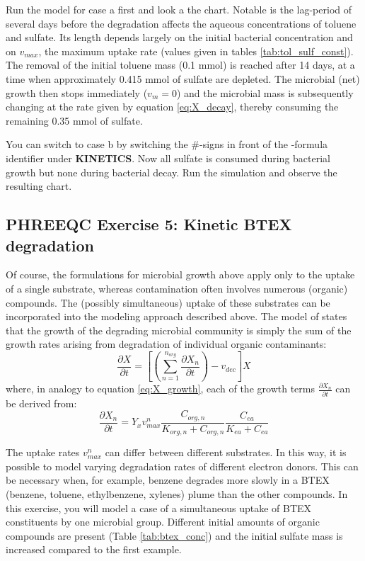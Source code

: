 Run the model for case a first and look a the chart. Notable is the lag-period of several days before the degradation affects the aqueous concentrations of toluene and sulfate. Its length depends largely on the initial bacterial concentration and on $v_{max}$, the maximum uptake rate (values given in tables \ref{tab:tol_sulf_const}). The removal of the initial toluene mass (0.1 mmol) is reached after 14 days, at a time when approximately 0.415 mmol of sulfate are depleted. The microbial (net) growth then stops immediately ($v_m = 0$) and the microbial mass is subsequently changing at the rate given by equation \ref{eq:X_decay}, thereby consuming the remaining 0.35 mmol of sulfate.

You can switch to case b by switching the \#-signs in front of the -formula identifier under \textbf{KINETICS}. Now all sulfate is consumed during bacterial growth but none during bacterial decay. Run the simulation and observe the resulting chart.

\subsection{PHREEQC Exercise 5: Kinetic BTEX degradation}
Of course, the formulations for microbial growth above apply only to the uptake of a single substrate, whereas contamination often involves numerous (organic) compounds. The (possibly simultaneous) uptake of these substrates can be incorporated into the modeling approach described above. The model of \cite{kincel89} states that the growth of the degrading microbial community is simply the sum of the growth rates arising from degradation of individual organic contaminants:
\begin{equation}
\frac{\partial X}{\partial t} = \left[ \left(\sum_{n=1}^{n_{org}} \frac{\partial X_{n}}{\partial t}\right) - v_{dec} \right] X
\end{equation}
where, in analogy to equation \ref{eq:X_growth}, each of the growth terms $\frac{\partial X_{n}}{\partial t}$ can be derived from:
\begin{equation}
\frac{\partial X_{n}}{\partial t} = Y_x v_{max}^n \frac{C_{org,n}}{K_{org,n} + C_{org,n}} \frac{C_{ea}}{K_{ea} + C_{ea}}
\label{eq:X_growthn}
\end{equation}

The uptake rates $v_{max}^n$ can differ between different substrates. In this way, it is possible to model varying degradation rates of different electron donors. This can be necessary when, for example, benzene degrades more slowly in a BTEX (benzene, toluene, ethylbenzene, xylenes) plume than the other compounds. In this exercise, you will model a case of a simultaneous uptake of BTEX constituents by one microbial group. Different initial amounts of organic compounds are present (Table \ref{tab:btex_conc}) and the initial sulfate mass is increased compared to the first example.

